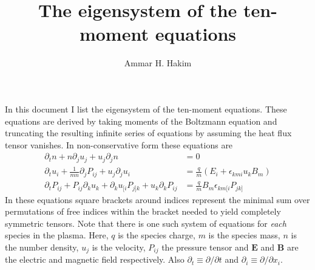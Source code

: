 \documentclass[11pt, reqno]{amsart}
\title[Tenmoment Eigensystem]{The eigensystem of the ten-moment
  equations}%
\author{Ammar H. Hakim}%
\date{}
\theoremstyle{definition}
\begin{document}
\maketitle

In this document I list the eigensystem of the ten-moment
equations. These equations are derived by taking moments of the
Boltzmann equation and truncating the resulting infinite series of
equations by assuming the heat flux tensor vanishes. In
non-conservative form these equations are
\begin{align}
  \partial_t{n} + n \partial_j{u_j} + u_j \partial_j{n} &= 0 \label{eq:n} \\
  \partial_t{u_i}
  + \frac{1}{mn}\partial_j{P_{ij}}
  + u_j \partial_j{u_i} &=
  \frac{q}{m}\left(E_i + \epsilon_{kmi}u_kB_m\right) \label{eq:ui} \\
  \partial_t{P_{ij}} + P_{ij}\partial_k{u_k}
  + \partial_k{u_{[i}}P_{j]k}
  + u_k\partial_k{P_{ij}}
  &= \frac{q}{m}B_m \epsilon_{km[i}P_{jk]} \label{eq:Pij}
\end{align}
In these equations square brackets around indices represent the
minimal sum over permutations of free indices within the bracket
needed to yield completely symmetric tensors. Note that there is one
such system of equations for \emph{each} species in the plasma. Here,
$q$ is the species charge, $m$ is the species mass, $n$ is the number
density, $u_j$ is the velocity, $P_{ij}$ the pressure tensor and
$\mathbf{E}$ and $\mathbf{B}$ are the electric and magnetic field
respectively. Also $\partial_t \equiv \partial /\partial t$ and
$\partial_i \equiv \partial /\partial x_i$.
\end{document}
